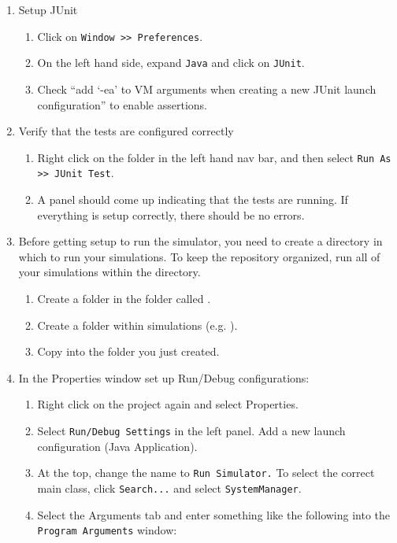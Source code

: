 \documentclass[11pt]{article}
\begin{document}
\begin{enumerate}
\item Setup JUnit
  \begin{enumerate}
  \item Click on \texttt{Window >> Preferences}.
  \item On the left hand side, expand \texttt{Java} and click on \texttt{JUnit}.
  \item Check ``add `-ea' to VM arguments when creating a new JUnit launch 
    configuration'' to enable assertions.
  \end{enumerate}

\item Verify that the tests are configured correctly
  \begin{enumerate}
  \item Right click on the  folder in the left hand nav bar, and
    then select \texttt{Run As >> JUnit Test}.
  \item A panel should come up indicating that the tests are running. If
    everything is setup correctly, there should be no errors.
  \end{enumerate}

\item Before getting setup to run the simulator, you need to create a directory in which to run your simulations.  To keep the repository organized, run all of your simulations within the  directory.
  \begin{enumerate}
  \item Create a folder in the  folder called .
  \item Create a folder within simulations (e.g. ).
  \item Copy  into the folder you just created.
  \end{enumerate}

\item In the Properties window set up Run/Debug configurations:
  \begin{enumerate}
  \item Right click on the project again and select Properties.
  \item Select \texttt{Run/Debug Settings} in the left panel. Add a new launch configuration (Java Application).
  \item At the top, change the name to \texttt{Run Simulator.} To select the
    correct main class, click \texttt{Search...} and select \texttt{SystemManager}.
  \item Select the Arguments tab and enter something like the following into the \texttt{Program Arguments} window:


\end{enumerate}
\end{enumerate}
\end{document}
